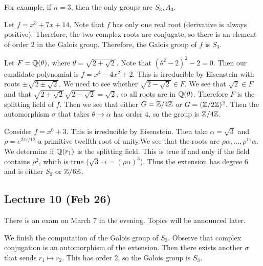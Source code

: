 \documentclass[10pt, twoside]{article}
\begin{document}
        For example, if $n = 3$, then the only groups are $S_3,A_3$.
        \begin{exm} Let $f = x^3 + 7x+14$. Note that $f$ has only one real root
            (derivative is always positive). Therefore, the two complex roots
            are conjugate, so there is an element of order $2$ in the Galois
            group. Therefore, the Galois group of $f$ is $S_3$.  \end{exm}

        \begin{exm} Let $F = \mathbb{Q}(\theta)$, where $\theta = \sqrt{2+\sqrt{2}}$.
            Note that $(\theta^2-2)^2 - 2 = 0$. Then our candidate polynomial
            is $f = x^4 - 4x^2+2$. This is irreducible by Eisenstein with roots
            $\pm \sqrt{2 \pm \sqrt{2}}$. We need to see whether
            $\sqrt{2-\sqrt{2}} \in F$. We see that $\sqrt{2} \in F$ and that
            $\sqrt{2+\sqrt{2}}\sqrt{2-\sqrt{2}} = \sqrt{2}$, so all roots are
            in $\mathbb{Q}(\theta)$. Therefore $F$ is the splitting field of $f$. Then
            we see that either $G = \mathbb{Z}/4\mathbb{Z}$ or $G = (\mathbb{Z}/2\mathbb{Z})^2$. Then the
            automorphism $\sigma$ that takes $\theta \to \alpha$ has order $4$,
            so the group is $\mathbb{Z}/4\mathbb{Z}$.  \end{exm}

        \begin{exm} Consider $f = x^6+3$. This is irreducible by Eisenstein.
            Then take $\alpha = \sqrt{3}$ and $\rho = e^{2 \pi i /12}$ a
            primitive twelfth root of unity.We see that the roots are
            $\rho\alpha, \ldots, \rho^{11}\alpha$. We determine if $\mathbb{Q}(r_1)$ is
            the splitting field. This is true if and only if the field contains
            $\rho^2$, which is true ($\sqrt{3} \cdot i = (\rho\alpha)^3$). Thus
            the extension has degree $6$ and is either $S_3$ or $\mathbb{Z}/6\mathbb{Z}$.
        \end{exm}

        \subsection{Lecture 10 (Feb 26)} There is an exam on March $7$ in the
        evening. Topics will be announced later.

        We finish the computation of the Galois group of $S_3$. Observe that
        complex conjugation is an automorphism of the extension. Then there
        exists another $\sigma$ that sends $r_1 \mapsto r_2$. This has order
        $2$, so the Galois group is $S_3$.
\end{document}
